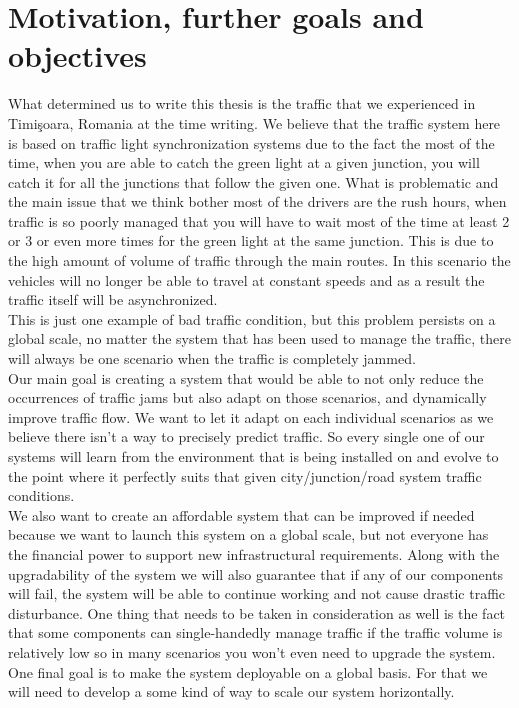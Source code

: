 \documentclass[17pt]{report}
\begin{document}
\section{Motivation, further goals and objectives}
\indent \indent
What determined us to  write this thesis is the traffic that we 
experienced in Timişoara, Romania at the time writing. We believe that
the traffic system here is based on traffic light synchronization systems 
due to the fact the most of the time, when you are able to catch the 
green light at a given junction, you will catch it for all the junctions 
that follow the given one. What is problematic and the main issue that 
we think bother most of the drivers are the rush hours, when traffic 
is so poorly managed that you will have to wait most of the time at least 
2 or 3 or even more times for the green light at the same junction. This 
is due to the high amount of volume of traffic through the main routes. In 
this scenario the vehicles will no longer be able to travel at constant 
speeds and as a result the traffic itself will be asynchronized. \\
\indent
This is just one example of bad traffic condition, but this problem 
persists on a global scale, no matter the system that has been used to 
manage the traffic, there will always be one scenario when the traffic 
is completely jammed. \\
\indent
Our main goal is creating a system that would be able to not only reduce 
the occurrences of traffic jams but also adapt on those scenarios, and 
dynamically improve traffic flow. We want to let it adapt on each 
individual scenarios as we believe there isn't a way to precisely 
predict traffic. So every single one of our systems will learn from 
the environment that is being installed on and evolve to the point 
where it perfectly suits that given city/junction/road system 
traffic conditions. \\
\indent 
We also want to create an affordable system that can be improved if 
needed because we want to launch this system on a global scale, but not 
everyone has the financial power to support new infrastructural requirements. 
Along with the upgradability of the system we will also guarantee that 
if any of our components will fail, the system will be able to continue
working and not cause drastic traffic disturbance. One thing that needs
to be taken in consideration as well is the fact that some components 
can single-handedly manage traffic if the traffic volume is relatively 
low so in many scenarios you won't even need to upgrade the system. \\
\indent
One final goal is to make the system deployable on a global basis. For 
that we will need to develop a some kind of way to scale our system 
horizontally.
\end{document}
